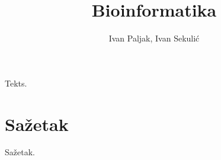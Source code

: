 \documentclass[times, utf8, seminar]{fer}
\begin{document}
\title{Bioinformatika}

\author{Ivan Paljak, Ivan Sekulić}


\maketitle

\tableofcontents

Tekts.
%

%

%

%





\chapter{Sažetak}
Sažetak.
\end{document}
